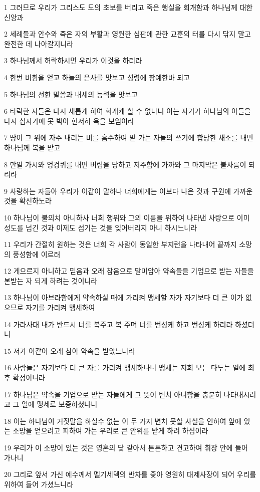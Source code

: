 \par 1 그러므로 우리가 그리스도 도의 초보를 버리고 죽은 행실을 회개함과 하나님께 대한 신앙과
\par 2 세례들과 안수와 죽은 자의 부활과 영원한 심판에 관한 교훈의 터를 다시 닦지 말고 완전한 데 나아갈지니라
\par 3 하나님께서 허락하시면 우리가 이것을 하리라
\par 4 한번 비췸을 얻고 하늘의 은사를 맛보고 성령에 참예한바 되고
\par 5 하나님의 선한 말씀과 내세의 능력을 맛보고
\par 6 타락한 자들은 다시 새롭게 하여 회개케 할 수 없나니 이는 자기가 하나님의 아들을 다시 십자가에 못 박아 현저히 욕을 보임이라
\par 7 땅이 그 위에 자주 내리는 비를 흡수하여 밭 가는 자들의 쓰기에 합당한 채소를 내면 하나님께 복을 받고
\par 8 만일 가시와 엉겅퀴를 내면 버림을 당하고 저주함에 가까와 그 마지막은 불사름이 되리라
\par 9 사랑하는 자들아 우리가 이같이 말하나 너희에게는 이보다 나은 것과 구원에 가까운 것을 확신하노라
\par 10 하나님이 불의치 아니하사 너희 행위와 그의 이름을 위하여 나타낸 사랑으로 이미 성도를 넘긴 것과 이제도 섬기는 것을 잊어버리지 아니 하시느니라
\par 11 우리가 간절히 원하는 것은 너희 각 사람이 동일한 부지런을 나타내어 끝까지 소망의 풍성함에 이르러
\par 12 게으르지 아니하고 믿음과 오래 참음으로 말미암아 약속들을 기업으로 받는 자들을 본받는 자 되게 하려는 것이니라
\par 13 하나님이 아브라함에게 약속하실 때에 가리켜 맹세할 자가 자기보다 더 큰 이가 없으므로 자기를 가리켜 맹세하여
\par 14 가라사대 내가 반드시 너를 복주고 복 주며 너를 번성케 하고 번성케 하리라 하셨더니
\par 15 저가 이같이 오래 참아 약속을 받았느니라
\par 16 사람들은 자기보다 더 큰 자를 가리켜 맹세하나니 맹세는 저희 모든 다투는 일에 최후 확정이니라
\par 17 하나님은 약속을 기업으로 받는 자들에게 그 뜻이 변치 아니함을 충분히 나타내시려고 그 일에 맹세로 보증하셨나니
\par 18 이는 하나님이 거짓말을 하실수 없는 이 두 가지 변치 못할 사실을 인하여 앞에 있는 소망을 얻으려고 피하여 가는 우리로 큰 안위를 받게 하려 하심이라
\par 19 우리가 이 소망이 있는 것은 영혼의 닻 같아서 튼튼하고 견고하여 휘장 안에 들어 가나니
\par 20 그리로 앞서 가신 예수께서 멜기세덱의 반차를 좇아 영원히 대제사장이 되어 우리를 위하여 들어 가셨느니라

